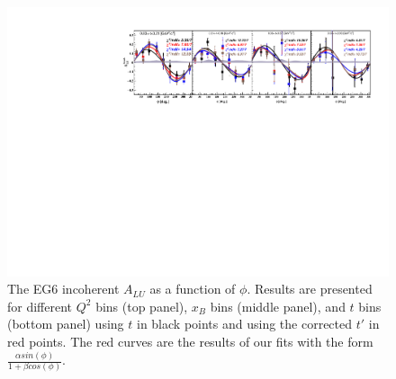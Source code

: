 \documentclass[a4paper,11pt,twoside]{article}
\begin{document}
\begin{figure}[tb]
\includegraphics[width=18cm]{fig/t_tprime_ALU_phi_p_t.pdf}
\caption{The EG6 incoherent $A_{LU}$ as a function of $\phi$. Results are 
   presented for different $Q^{2}$ bins (top panel), $x_{B}$ bins (middle 
   panel), and $t$ bins (bottom panel) using $t$ in black points and using the 
   corrected $t'$ in red points.  The red curves are the results of our fits 
   with the form $\frac{\alpha sin(\phi)}{1+ \beta cos(\phi)}$.}
\label{fig:alu}
\end{figure}
\end{document}
